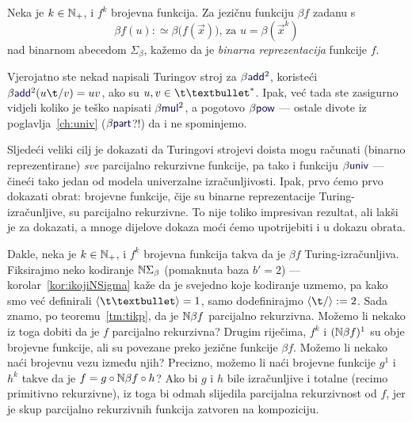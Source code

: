 \begin{definicija}
Neka je $k\in{\mathbb N}_+$, i $f^k$ brojevna funkcija. Za jezičnu funkciju $\beta f$ zadanu s \begin{equation}\label{eq:betaf}
    \beta f(u):\simeq\beta\bigl(f(\vec x)\bigr)\text{, za } u=\beta(\vec x^k)
\end{equation}
nad binarnom abecedom $\Sigma_\beta$, kažemo da je \emph{binarna reprezentacija} funkcije $f$.
\end{definicija}

Vjerojatno ste nekad napisali Turingov stroj za $\beta\f{add}^2$, koristeći $\beta\f{add}^2(u\t/v)=uv$, ako su $u,v\in\t\textbullet^*$. Ipak, već tada ste zasigurno vidjeli koliko je teško napisati $\beta\f{mul}^2$, a pogotovo $\beta\f{pow}$ --- ostale divote iz poglavlja~\ref{ch:univ} ($\beta\f{part}$?!) da i ne spominjemo.

Sljedeći veliki cilj je dokazati da Turingovi strojevi doista mogu računati (binarno reprezentirane) \emph{sve} parcijalno rekurzivne funkcije, pa tako i funkciju $\beta\f{univ}$ --- čineći tako jedan od modela univerzalne izračunljivosti. Ipak, prvo ćemo prvo dokazati obrat: brojevne funkcije, čije su binarne reprezentacije Turing-izračunljive, su parcijalno rekurzivne. To nije toliko impresivan rezultat, ali lakši je za dokazati, a mnoge dijelove dokaza moći ćemo upotrijebiti i u dokazu obrata.


Dakle, neka je $k\in{\mathbb N}_+$, i $f^k$ brojevna funkcija takva da je $\beta f$ Turing-izračunljiva. Fiksirajmo neko kodiranje ${\mathbb N}\Sigma_\beta$ (pomaknuta baza $b'=2$) --- korolar~\ref{kor:ikojiNSigma} kaže da je svejedno koje kodiranje uzmemo, pa kako smo već definirali $\kr{\t\textbullet}=1$, samo dodefinirajmo $\kr{\t/}:=2$.
Sada znamo, po teoremu~\ref{tm:tikp}, da je ${\mathbb N}\beta f$ parcijalno rekurzivna. Možemo li nekako iz toga dobiti da je $f$ parcijalno rekurzivna? Drugim riječima, $f^k$ i $({\mathbb N}\beta f)^1$ su obje brojevne funkcije, ali su povezane preko jezične funkcije $\beta f$. Možemo li nekako naći brojevnu vezu između njih? Precizno, možemo li naći brojevne funkcije $g^1$ i $h^k$ takve da je $f=g\circ{\mathbb N}\beta f\circ h$? Ako bi $g$ i $h$ bile izračunljive i totalne (recimo primitivno rekurzivne), iz toga bi odmah slijedila parcijalna rekurzivnost od $f$, jer je skup parcijalno rekurzivnih funkcija zatvoren na kompoziciju.

